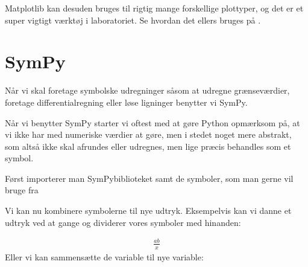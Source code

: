 \documentclass[letterpaper,10pt,english]{jupyterBook}
\begin{document}
\noindent{}

Matplotlib kan desuden bruges til rigtig mange forskellige plottyper, og det er et super vigtigt værktøj i laboratoriet. Se hvordan det ellers bruges på {\hyperref[\detokenize{notebooks/MekRel/Matplotlib_pyplot::doc}]{}}.


\section{SymPy}
\label{\detokenize{notebooks/Intro_til_pakker:sympy}}
Når vi skal foretage symbolske udregninger såsom at udregne grænseværdier, foretage differentialregning eller løse ligninger benytter vi SymPy.

Når vi benytter SymPy starter vi oftest med at gøre Python opmærksom på, at vi ikke har med numeriske værdier at gøre, men i stedet noget mere abstrakt, som altså ikke skal afrundes eller udregnes, men lige præcis behandles som et symbol.

Først importerer man SymPy\sphinxhyphen{}biblioteket samt de symboler, som man gerne vil bruge fra 

\begin{sphinxVerbatim}[commandchars=\\\{\}]
                      
         
\end{sphinxVerbatim}

Vi kan nu kombinere symbolerne til nye udtryk.
Eksempelvis kan vi danne et udtryk ved at gange og dividerer vores symboler med hinanden:

\begin{sphinxVerbatim}[commandchars=\\\{\}]
     
\end{sphinxVerbatim}
\begin{equation*}
\begin{split}\displaystyle \frac{a b}{x}\end{split}
\end{equation*}
Eller vi kan sammensætte de variable til nye variable:
\end{document}
